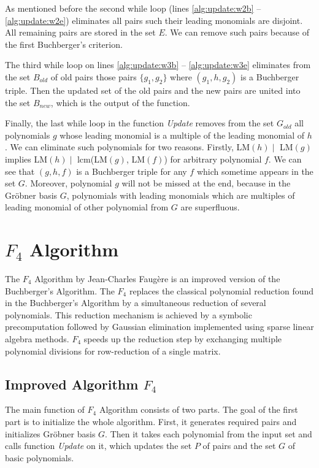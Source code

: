 As mentioned before the second while loop (lines \ref{alg:update:w2b} -- \ref{alg:update:w2e}) eliminates all pairs such their leading monomials are disjoint. All remaining pairs are stored in the set $E$. We can remove such pairs because of the first Buchberger's criterion.

The third while loop on lines \ref{alg:update:w3b} -- \ref{alg:update:w3e} eliminates from the set $B_{old}$ of old pairs those pairs $\{g_1, g_2\}$ where $(g_1, h, g_2)$ is a Buchberger triple. Then the updated set of the old pairs and the new pairs are united into the set $B_{new}$, which is the output of the function.

Finally, the last while loop in the function \textit{Update} removes from the set $G_{old}$ all polynomials $g$ whose leading monomial is a multiple of the leading monomial of $h$. We can eliminate such polynomials for two reasons. Firstly, LM$(h) \mid$ LM$(g)$ implies LM$(h) \mid$ lcm(LM$(g)$, LM$(f)$) for arbitrary polynomial $f$. We can see that $(g, h, f)$ is a Buchberger triple for any $f$ which sometime appears in the set $G$. Moreover, polynomial $g$ will not be missed at the end, because in the Gr\"obner basis $G$, polynomials with leading monomials which are multiples of leading monomial of other polynomial from $G$ are superfluous.



\section{$F_4$ Algorithm}
The $F_4$ Algorithm \cite{F4} by Jean-Charles Faug\`ere is an improved version of the Buchberger's Algorithm. The $F_4$ replaces the classical polynomial reduction found in the Buchberger's Algorithm by a simultaneous reduction of several polynomials. This reduction mechanism is achieved by a symbolic precomputation followed by Gaussian elimination implemented using sparse linear algebra methods. $F_4$ speeds up the reduction step by exchanging multiple polynomial divisions for row-reduction of a single matrix.

\subsection{Improved Algorithm $F_4$}
The main function of $F_4$ Algorithm consists of two parts. The goal of the first part is to initialize the whole algorithm. First, it generates required pairs and initializes Gr\"obner basis $G$. Then it takes each polynomial from the input set and calls function \textit{Update} on it, which updates the set $P$ of pairs and the set $G$ of basic polynomials.

